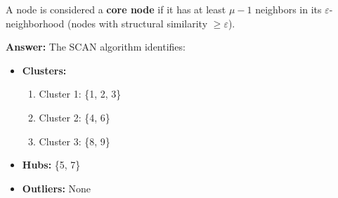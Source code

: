 \documentclass{article}
\begin{document}
A node is considered a \textbf{core node} if it has at least \( \mu - 1 \) neighbors in its \( \varepsilon \)-neighborhood (nodes with structural similarity \( \geq \varepsilon \)).

\vspace{5mm}

\textbf{Answer:} The SCAN algorithm identifies:
\begin{itemize}
    \item \textbf{Clusters:}
    \begin{enumerate}
        \item Cluster 1: \{1, 2, 3\}
        \item Cluster 2: \{4, 6\}
        \item Cluster 3: \{8, 9\}
    \end{enumerate}
    \item \textbf{Hubs:} \{5, 7\}
    \item \textbf{Outliers:} None
\end{itemize}
\end{document}
